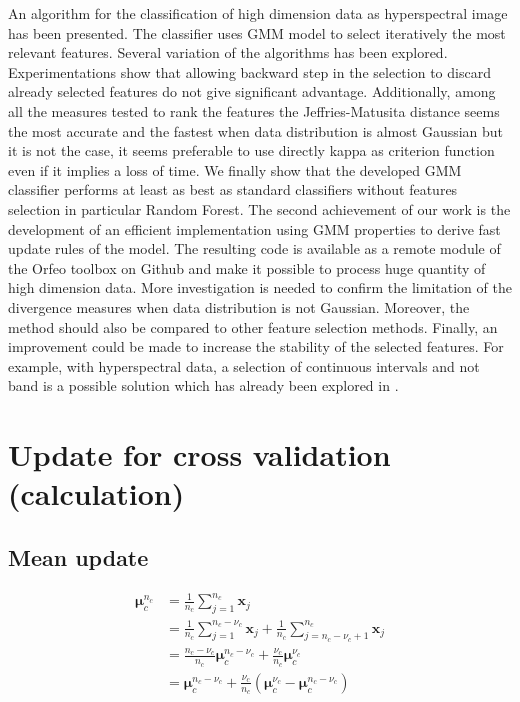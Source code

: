 \documentclass[a4paper,11pt,DIV=16,abstracton]{scrartcl}
\begin{document}
An algorithm for the classification of high dimension data as hyperspectral image has been presented. The classifier uses GMM model to select iteratively the most relevant features. Several variation of the algorithms has been explored. Experimentations show that allowing backward step in the selection to discard already selected features do not give significant advantage. Additionally, among all the measures tested to rank the features the Jeffries-Matusita distance seems the most accurate and the fastest when data distribution is almost Gaussian but it is not the case, it seems preferable to use directly kappa as criterion function even if it implies a loss of time. We finally show that the developed GMM classifier performs at least as best as standard classifiers without features selection in particular Random Forest.
The second achievement of our work is the development of an efficient implementation using GMM properties to derive fast update rules of the model. The resulting code is available as a remote module of the Orfeo toolbox on Github and make it possible to process huge quantity of high dimension data.
More investigation is needed to confirm the limitation of the divergence measures when data distribution is not Gaussian. Moreover, the method should also be compared to other feature selection methods. Finally, an improvement could be made to increase the stability of the selected features. For example, with hyperspectral data, a selection of continuous intervals and not band is a possible solution which has already been explored in \cite{serpico2007extraction}.

\newpage

\appendix
\section{Update for cross validation (calculation)}
\label{app:cv_maj}

    \subsection{Mean update}
        \begin{align*}
            \boldsymbol{\mu}_c^{n_c} &= \frac{1}{n_c} \sum_{j = 1}^{n_c} \mathbf{x}_j \\
                        &= \frac{1}{n_c} \sum_{j = 1}^{n_c-\nu_c} \mathbf{x}_j + \frac{1}{n_c} \sum_{j = n_c-\nu_c +1}^{n_c} \mathbf{x}_j \\
                        &= \frac{n_c-\nu_c}{n_c} \boldsymbol{\mu}_c^{n_c-\nu_c} + \frac{\nu_c}{n_c} \boldsymbol{\mu}_c^{\nu_c} \\
                        &= \boldsymbol{\mu}_c^{n_c-\nu_c} + \frac{\nu_c}{n_c} (\boldsymbol{\mu}_c^{\nu_c} - \boldsymbol{\mu}_c^{n_c-\nu_c})
        \end{align*}
\end{document}
